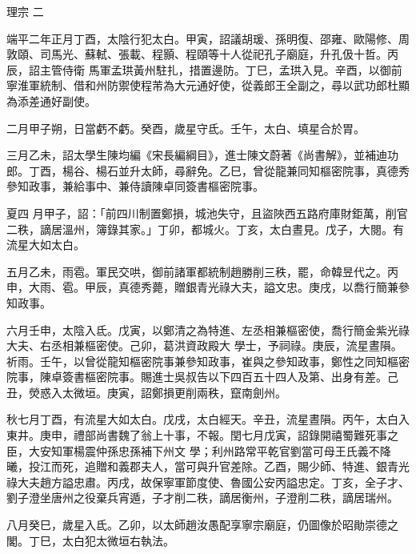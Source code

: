 
\begin{pinyinscope}

 理宗
 二



 端平二年正月丁酉，太陰行犯太白。甲寅，詔議胡瑗、孫明復、邵雍、歐陽修、周敦頤、司馬光、蘇軾、張載、程顥、程頤等十人從祀孔子廟庭，升孔伋十哲。丙辰，詔主管侍衛
 馬軍孟珙黃州駐扎，措置邊防。丁巳，孟珙入見。辛酉，以御前寧淮軍統制、借和州防禦使程芾為大元通好使，從義郎王全副之，尋以武功郎杜顯為添差通好副使。



 二月甲子朔，日當虧不虧。癸酉，歲星守氐。壬午，太白、填星合於胃。



 三月乙未，詔太學生陳均編《宋長編綱目》，進士陳文蔚著《尚書解》，並補迪功郎。丁酉，楊谷、楊石並升太師，尋辭免。乙巳，曾從龍兼同知樞密院事，真德秀參知政事，兼給事中、兼侍讀陳卓同簽書樞密院事。



 夏四
 月甲子，詔：「前四川制置鄭損，城池失守，且盜陜西五路府庫財鉅萬，削官二秩，謫居溫州，簿錄其家。」丁卯，都城火。丁亥，太白晝見。戊子，大閱。有流星大如太白。



 五月乙未，雨雹。軍民交哄，御前諸軍都統制趙勝削三秩，罷，命韓昱代之。丙申，大雨、雹。甲辰，真德秀薨，贈銀青光祿大夫，謚文忠。庚戌，以喬行簡兼參知政事。



 六月壬申，太陰入氐。戊寅，以鄭清之為特進、左丞相兼樞密使，喬行簡金紫光祿大夫、右丞相兼樞密使。己卯，葛洪資政殿大
 學士，予祠祿。庚辰，流星晝隕。祈雨。壬午，以曾從龍知樞密院事兼參知政事，崔與之參知政事，鄭性之同知樞密院事，陳卓簽書樞密院事。賜進士吳叔告以下四百五十四人及第、出身有差。己丑，熒惑入太微垣。庚寅，詔鄭損更削兩秩，竄南劍州。



 秋七月丁酉，有流星大如太白。戊戌，太白經天。辛丑，流星晝隕。丙午，太白入東井。庚申，禮部尚書魏了翁上十事，不報。閏七月戊寅，詔錄開禧蜀難死事之臣，大安知軍楊震仲孫忠孫補下州文
 學；利州路常平乾官劉當可母王氏義不降曦，投江而死，追贈和義郡夫人，當可與升官差除。乙酉，賜少師、特進、銀青光祿大夫趙方謚忠肅。丙戌，故保寧軍節度使、魯國公安丙謚忠定。丁亥，全子才、劉子澄坐唐州之役棄兵宵遁，子才削二秩，謫居衡州，子澄削二秩，謫居瑞州。



 八月癸巳，歲星入氐。乙卯，以太師趙汝愚配享寧宗廟庭，仍圖像於昭勛崇德之閣。丁巳，太白犯太微垣右執法。




\end{pinyinscope}
